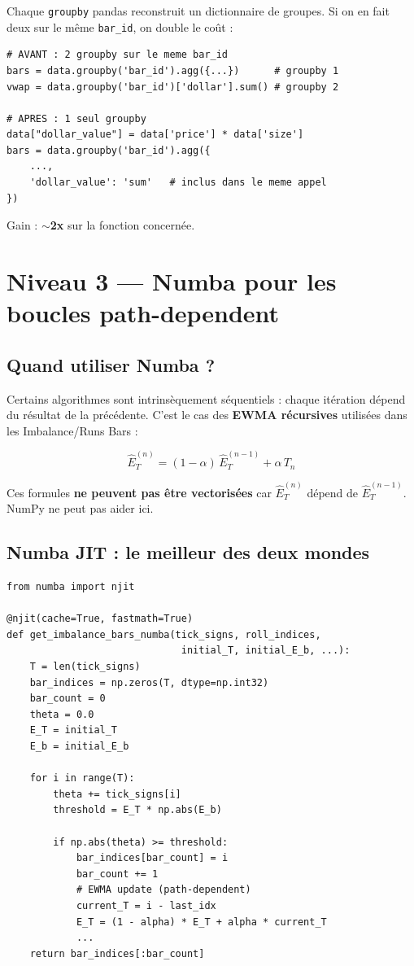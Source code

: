 \documentclass[11pt, a4paper]{article}
\begin{document}
Chaque \texttt{groupby} pandas reconstruit un dictionnaire de groupes.
Si on en fait deux sur le m\^eme \texttt{bar\_id}, on double le co\^ut :

\begin{lstlisting}
# AVANT : 2 groupby sur le meme bar_id
bars = data.groupby('bar_id').agg({...})      # groupby 1
vwap = data.groupby('bar_id')['dollar'].sum() # groupby 2

# APRES : 1 seul groupby
data["dollar_value"] = data['price'] * data['size']
bars = data.groupby('bar_id').agg({
    ...,
    'dollar_value': 'sum'   # inclus dans le meme appel
})
\end{lstlisting}

Gain : $\sim$\textbf{2x} sur la fonction concern\'ee.


\section{Niveau 3 --- Numba pour les boucles path-dependent}

\subsection{Quand utiliser Numba ?}

Certains algorithmes sont intrins\`equement s\'equentiels : chaque it\'eration
d\'epend du r\'esultat de la pr\'ec\'edente. C'est le cas des \textbf{EWMA r\'ecursives}
utilis\'ees dans les Imbalance/Runs Bars :

\begin{equation}
    \hat{E}_T^{(n)} = (1 - \alpha)\,\hat{E}_T^{(n-1)} + \alpha\,T_n
\end{equation}

Ces formules \textbf{ne peuvent pas \^etre vectoris\'ees} car $\hat{E}_T^{(n)}$
d\'epend de $\hat{E}_T^{(n-1)}$. NumPy ne peut pas aider ici.

\subsection{Numba JIT : le meilleur des deux mondes}

\begin{lstlisting}
from numba import njit

@njit(cache=True, fastmath=True)
def get_imbalance_bars_numba(tick_signs, roll_indices,
                              initial_T, initial_E_b, ...):
    T = len(tick_signs)
    bar_indices = np.zeros(T, dtype=np.int32)
    bar_count = 0
    theta = 0.0
    E_T = initial_T
    E_b = initial_E_b

    for i in range(T):
        theta += tick_signs[i]
        threshold = E_T * np.abs(E_b)

        if np.abs(theta) >= threshold:
            bar_indices[bar_count] = i
            bar_count += 1
            # EWMA update (path-dependent)
            current_T = i - last_idx
            E_T = (1 - alpha) * E_T + alpha * current_T
            ...
    return bar_indices[:bar_count]
\end{lstlisting}
\end{document}
